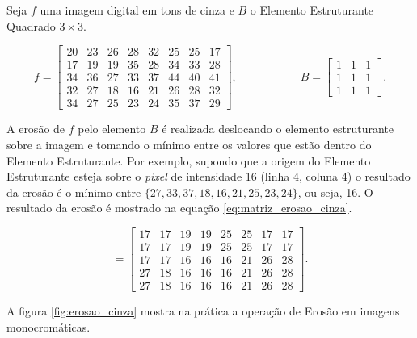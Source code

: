 \begin{exemplo} 
	
	Seja $f$ uma imagem digital em tons de cinza e $B$ o Elemento Estruturante Quadrado $3 \times 3$.
	
	\begin{equation}
		f = \begin{bmatrix}
			20 & 23 & 26 & 28 & 32 & 25 & 25 & 17 \\
			17 & 19 & 19 & 35 & 28 & 34 & 33 & 28 \\
			34 & 36 & 27 & 33 & 37 & 44 & 40 & 41 \\
			32 & 27 & 18 & 16 & 21 & 26 & 28 & 32 \\
			34 & 27 & 25 & 23 & 24 & 35 & 37 & 29 
		\end{bmatrix}, \; \; \; \; \; \; \; \; \; \; \; \; \; \; \; \; \; \; \; \;
		B = \begin{bmatrix}
			1 & 1 & 1 \\
			1 & 1 & 1 \\
			1 & 1 & 1 
		\end{bmatrix}.
	\end{equation}
	
	A erosão de $f$ pelo elemento $B$ é realizada deslocando o elemento estruturante sobre a imagem e tomando o mínimo entre os valores que estão dentro do Elemento Estruturante. Por exemplo, supondo que a origem do Elemento Estruturante esteja sobre o \textit{pixel} de intensidade 16 (linha 4, coluna 4) o resultado da erosão é o mínimo entre $\{27, 33, 37, 18, 16, 21, 25, 23, 24\}$, ou seja, 16. O resultado da erosão é mostrado na equação \ref{eq:matriz_erosao_cinza}.
	
	
	\begin{equation}
		[f \ominus B] = \begin{bmatrix}
			17 & 17 & 19 & 19 & 25 & 25 & 17 & 17 \\
			17 & 17 & 19 & 19 & 25 & 25 & 17 & 17 \\
			17 & 17 & 16 & 16 & 16 & 21 & 26 & 28 \\
			27 & 18 & 16 & 16 & 16 & 21 & 26 & 28 \\
			27 & 18 & 16 & 16 & 16 & 21 & 26 & 28 
		\end{bmatrix}.
		\label{eq:matriz_erosao_cinza}
	\end{equation}
\end{exemplo}

A figura \ref{fig:erosao_cinza} mostra na prática a operação de Erosão em imagens monocromáticas.

